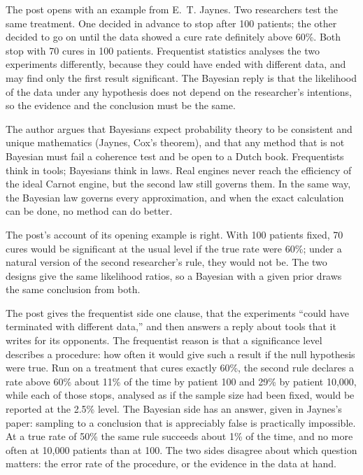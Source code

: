 \begin{afterword}
\summaryhead

The post opens with an example from E.~T. Jaynes. Two researchers test the same treatment. One decided in advance to stop after 100 patients; the other decided to go on until the data showed a cure rate definitely above 60\%. Both stop with 70 cures in 100 patients. Frequentist statistics analyses the two experiments differently, because they could have ended with different data, and may find only the first result significant. The Bayesian reply is that the likelihood of the data under any hypothesis does not depend on the researcher's intentions, so the evidence and the conclusion must be the same.

The author argues that Bayesians expect probability theory to be consistent and unique mathematics (Jaynes, Cox's theorem), and that any method that is not Bayesian must fail a coherence test and be open to a Dutch book. Frequentists think in tools; Bayesians think in laws. Real engines never reach the efficiency of the ideal Carnot engine, but the second law still governs them. In the same way, the Bayesian law governs every approximation, and when the exact calculation can be done, no method can do better.

\responsehead

The post's account of its opening example is right. With 100 patients fixed, 70 cures would be significant at the usual level if the true rate were 60\%; under a natural version of the second researcher's rule, they would not be. The two designs give the same likelihood ratios, so a Bayesian with a given prior draws the same conclusion from both.

The post gives the frequentist side one clause, that the experiments ``could have terminated with different data,'' and then answers a reply about tools that it writes for its opponents. The frequentist reason is that a significance level describes a procedure: how often it would give such a result if the null hypothesis were true. Run on a treatment that cures exactly 60\%, the second rule declares a rate above 60\% about 11\% of the time by patient 100 and 29\% by patient 10,000, while each of those stops, analysed as if the sample size had been fixed, would be reported at the 2.5\% level. The Bayesian side has an answer, given in Jaynes's paper: sampling to a conclusion that is appreciably false is practically impossible. At a true rate of 50\% the same rule succeeds about 1\% of the time, and no more often at 10,000 patients than at 100. The two sides disagree about which question matters: the error rate of the procedure, or the evidence in the data at hand.


\end{afterword}
